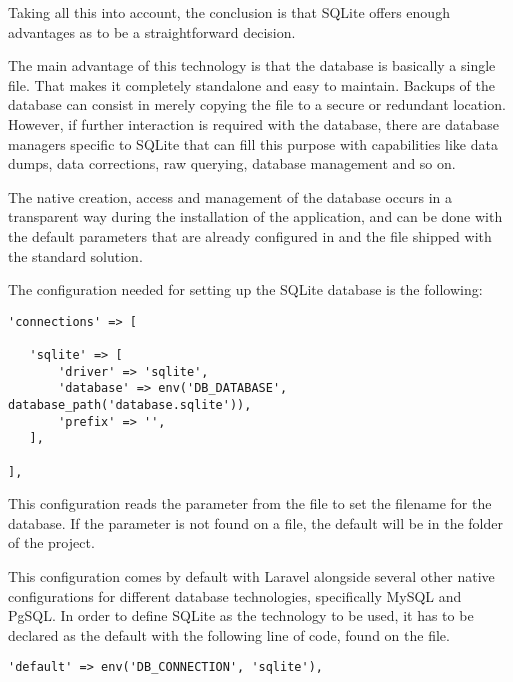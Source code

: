 Taking all this into account, the conclusion is that SQLite offers enough advantages as to be a straightforward decision.

The main advantage of this technology is that the database is basically a single file. That makes it completely standalone and easy to maintain. Backups of the database can consist in merely copying the file to a secure or redundant location. However, if further interaction is required with the database, there are database managers specific to SQLite that can fill this purpose with capabilities like data dumps, data corrections, raw querying, database management and so on.

The native creation, access and management of the database occurs in a transparent way during the installation of the application, and can be done with the default parameters that are already configured in  and the  file shipped with the standard solution.

The configuration needed for setting up the SQLite database is the following:

\begin{verbatim}
'connections' => [

   'sqlite' => [
       'driver' => 'sqlite',
       'database' => env('DB_DATABASE', database_path('database.sqlite')),
       'prefix' => '',
   ],

],
\end{verbatim}

This configuration reads the  parameter from the  file to set the filename for the database. If the parameter is not found on a  file, the default will be  in the  folder of the project.

This configuration comes by default with Laravel alongside several other native configurations for different database technologies, specifically MySQL and PgSQL. In order to define SQLite as the technology to be used, it has to be declared as the default with the following line of code, found on the  file.

\begin{verbatim}
'default' => env('DB_CONNECTION', 'sqlite'),
\end{verbatim}

